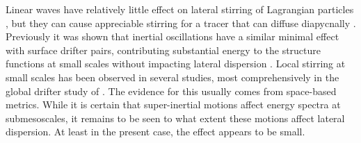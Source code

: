 \documentclass[]{ametsoc}
\begin{document}




Linear waves have relatively little effect on lateral stirring of Lagrangian particles \citep{holmes2011particle}, but they can cause appreciable stirring for a tracer that can diffuse diapycnally \citep{young1982shear}. Previously it was shown that inertial oscillations have a similar minimal effect with surface drifter pairs, contributing substantial energy to the structure functions at small scales without impacting lateral dispersion \citep{vera2016}. 
Local stirring at small scales has been observed in several studies, most comprehensively in the global drifter study of \cite{Corrado2017}. The evidence for this usually comes from space-based metrics. While it is certain that super-inertial motions affect energy spectra at submesoscales, it remains to be seen to what extent these motions affect lateral dispersion. At least in the present case, the effect appears to be small.

\end{document}

